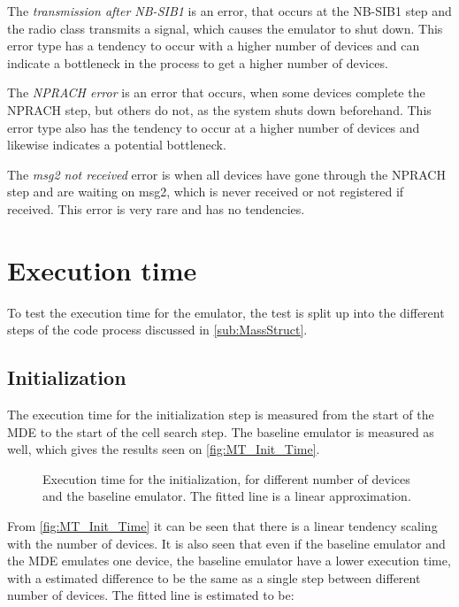The \textit{transmission after NB-SIB1} is an error, that occurs at the NB-SIB1 step and the radio class transmits a signal, which causes the emulator to shut down. This error type has a tendency to occur with a higher number of devices and can indicate a bottleneck in the process to get a higher number of devices.

The \textit{NPRACH error} is an error that occurs, when some devices complete the NPRACH step, but others do not, as the system shuts down beforehand. This error type also has the tendency to occur at a higher number of devices and likewise indicates a potential bottleneck.

The \textit{msg2 not received} error is when all devices have gone through the NPRACH step and are waiting on msg2, which is never received or not registered if received. This error is very rare and has no tendencies.

\section{Execution time}
\label{sec:exeTime}
To test the execution time for the emulator, the test is split up into the different steps of the code process discussed in \autoref{sub:MassStruct}.

\subsection{Initialization}
The execution time for the initialization step is measured from the start of the MDE to the start of the cell search step. The baseline emulator is measured as well, which gives the results seen on \autoref{fig:MT_Init_Time}.


\begin{figure}[H]
\centering

\caption{Execution time for the initialization, for different number of devices and the baseline emulator. The fitted line is a linear approximation.}
\label{fig:MT_Init_Time}
\end{figure}

From \autoref{fig:MT_Init_Time} it can be seen that there is a linear tendency scaling with the number of devices. It is also seen that even if the baseline emulator and the MDE emulates one device, the baseline emulator have a lower execution time, with a estimated difference to be the same as a single step between different number of devices. The fitted line is estimated to be:

